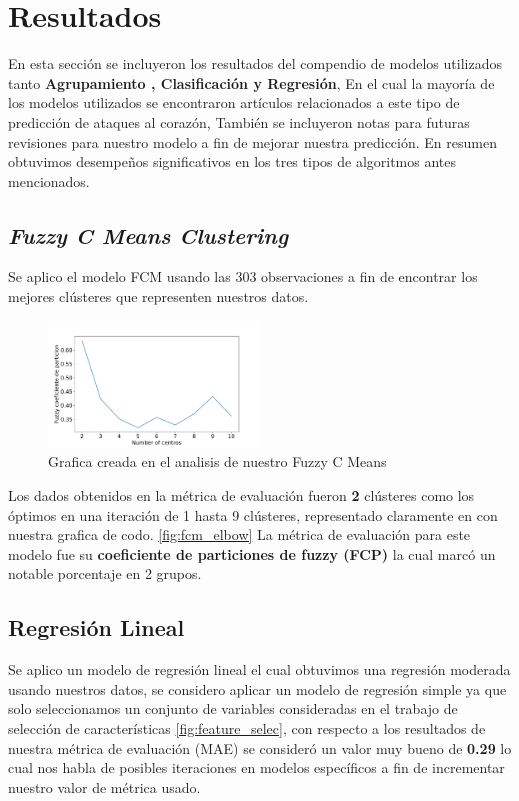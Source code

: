 \documentclass[10pt,journal]{IEEEtran}
\begin{document}
\section{Resultados}

En esta sección se incluyeron los resultados del compendio de modelos utilizados tanto \textbf{Agrupamiento , Clasificación y Regresión}, En el cual la mayoría de los modelos utilizados se encontraron artículos relacionados a este tipo de predicción de ataques al corazón, También se incluyeron notas para futuras revisiones para nuestro modelo a fin de mejorar nuestra predicción. En resumen obtuvimos desempeños significativos en los tres tipos de algoritmos antes mencionados.

\subsection{\textit{Fuzzy C Means Clustering}}
Se aplico el modelo FCM usando las 303 observaciones a fin de encontrar los mejores clústeres que representen nuestros datos.

\begin{figure}[ht]
    \centering
    \includegraphics[width=0.5\textwidth,height=0.5\textheight,keepaspectratio]{elbow.pdf}
    \caption{ Grafica creada en el analisis de nuestro Fuzzy C Means} 
    \label{fig:fcm_elbow}
\end{figure}

Los dados obtenidos en la métrica de evaluación fueron \textbf{2} clústeres como los óptimos en una iteración de 1 hasta 9 clústeres, representado claramente en con nuestra grafica de codo. \autoref{fig:fcm_elbow} La métrica de evaluación para este modelo fue su \textbf{coeficiente de particiones de fuzzy (FCP)} la cual marcó un notable porcentaje en 2 grupos.


\subsection{Regresión Lineal}

Se aplico un modelo de regresión lineal el cual obtuvimos una regresión moderada usando nuestros datos, se considero aplicar un modelo de regresión simple ya que solo seleccionamos un conjunto de variables consideradas en el trabajo de selección de características \ref{fig:feature_selec}, con respecto a los resultados de  nuestra métrica de evaluación (MAE) se consideró  un valor muy bueno de  \textbf{0.29} lo cual nos habla de posibles iteraciones en modelos específicos a fin de incrementar nuestro valor de métrica usado.
\end{document}
